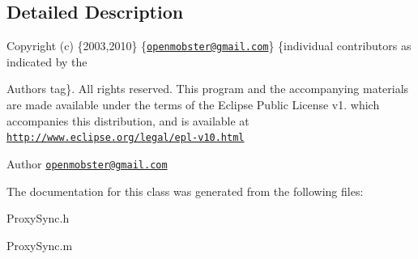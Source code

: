 \subsection{\-Detailed \-Description}
\-Copyright (c) \{2003,2010\} \{\href{mailto:openmobster@gmail.com}{\tt openmobster@gmail.\-com}\} \{individual contributors as indicated by the \begin{DoxyAuthor}{\-Authors}
tag\}. \-All rights reserved. \-This program and the accompanying materials are made available under the terms of the \-Eclipse \-Public \-License v1. which accompanies this distribution, and is available at \href{http://www.eclipse.org/legal/epl-v10.html}{\tt http\-://www.\-eclipse.\-org/legal/epl-\/v10.\-html}
\end{DoxyAuthor}
\begin{DoxyAuthor}{\-Author}
\href{mailto:openmobster@gmail.com}{\tt openmobster@gmail.\-com} 
\end{DoxyAuthor}


\-The documentation for this class was generated from the following files\-:\begin{DoxyCompactItemize}
\item 
\-Proxy\-Sync.\-h\item 
\-Proxy\-Sync.\-m\end{DoxyCompactItemize}
